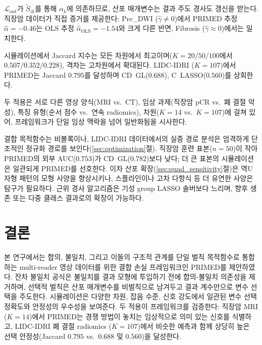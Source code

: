 \documentclass[a4paper,11pt]{article}
\begin{document}
$\mathcal{L}_{\mathrm{out}}$가 $\tilde S_{ik}$를 통해 $\alpha_k$에 의존하므로, 산포 매개변수는 결과 주도 경사도 갱신을 받는다.
직장암 데이터가 직접 증거를 제공한다: Pre\_DWI ($\hat\gamma \neq 0$)에서 PRIMED 추정 $\hat\alpha = -0.46$는 OLS 추정 $\hat\alpha_{\mathrm{OLS}} = -1.54$와 크게 다른 반면, Fibrosis ($\hat\gamma \approx 0$)에서는 일치한다.


시뮬레이션에서 Jaccard 지수는 모든 차원에서 최고이며($K = 20/50/100$에서 $0.507/0.352/0.228$), 격차는 고차원에서 확대된다.
LIDC-IDRI ($K = 107$)에서 PRIMED는 Jaccard $0.795$를 달성하며 CD~GL($0.688$), C~LASSO($0.560$)를 상회한다.


두 적용은 서로 다른 영상 양식(MRI vs.\ CT), 임상 과제(직장암 pCR vs.\ 폐 결절 악성), 특징 유형(순서 점수 vs.\ 연속 radiomics), 차원($K = 14$ vs.\ $K = 107$)에 걸쳐 있어, 프레임워크가 단일 임상 맥락을 넘어 일반화됨을 시사한다.


결합 목적함수는 비볼록이나, LIDC-IDRI 데이터에서의 실증 경로 분석은 엄격하게 단조적인 정규화 경로를 보인다(\ref{sec:optimization}절).
직장암 훈련 표본($n = 50$)이 작아 PRIMED의 외부 AUC($0.753$)가 CD~GL($0.782$)보다 낮다; 더 큰 표본의 시뮬레이션은 일관되게 PRIMED를 선호한다.
이차 산포 확장(\ref{sec:quad_sensitivity}절)은 역U자형 패턴의 모형 사양을 향상시키나, 스플라인이나 고차 다항식 등 더 유연한 사양은 탐구가 필요하다.
근위 경사 알고리즘은 기성 group LASSO 솔버보다 느리며, 향후 생존 또는 다중 클래스 결과로의 확장이 가능하다.

\section{결론}\label{sec:conclusions}

본 연구에서는 합의, 불일치, 그리고 이들의 구조적 관계를 단일 벌칙 목적함수로 통합하는 multi-reader 영상 데이터를 위한 결합 손실 프레임워크인 PRIMED를 제안하였다.
잔차 불일치 공식은 불일치를 결과 모형에 투입하기 전에 합의-불일치 의존성을 제거하며, 선택적 벌칙은 산포 매개변수를 비벌칙으로 남겨두고 결과 계수만으로 변수 선택을 주도한다.
시뮬레이션은 다양한 차원, 잡음 수준, 신호 강도에서 일관된 변수 선택 정확도와 안정성의 우수성을 보여준다.
두 적용이 프레임워크를 검증한다: 직장암 MRI ($K = 14$)에서 PRIMED는 경쟁 방법이 놓치는 임상적으로 의미 있는 신호를 식별하고, LIDC-IDRI 폐 결절 radiomics ($K = 107$)에서 비슷한 예측과 함께 상당히 높은 선택 안정성(Jaccard $0.795$ vs.\ $0.688$ 및 $0.560$)을 달성한다.
\end{document}

